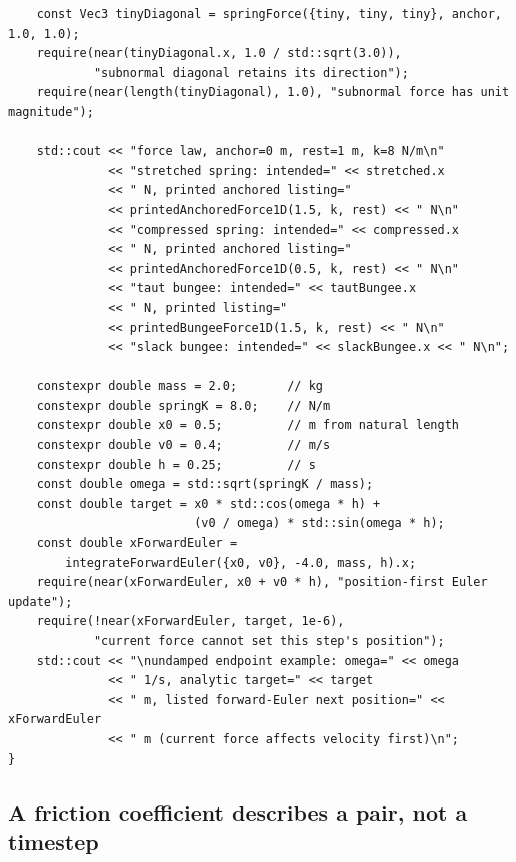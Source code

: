 \begin{verbatim}
    const Vec3 tinyDiagonal = springForce({tiny, tiny, tiny}, anchor, 1.0, 1.0);
    require(near(tinyDiagonal.x, 1.0 / std::sqrt(3.0)),
            "subnormal diagonal retains its direction");
    require(near(length(tinyDiagonal), 1.0), "subnormal force has unit magnitude");

    std::cout << "force law, anchor=0 m, rest=1 m, k=8 N/m\n"
              << "stretched spring: intended=" << stretched.x
              << " N, printed anchored listing="
              << printedAnchoredForce1D(1.5, k, rest) << " N\n"
              << "compressed spring: intended=" << compressed.x
              << " N, printed anchored listing="
              << printedAnchoredForce1D(0.5, k, rest) << " N\n"
              << "taut bungee: intended=" << tautBungee.x
              << " N, printed listing="
              << printedBungeeForce1D(1.5, k, rest) << " N\n"
              << "slack bungee: intended=" << slackBungee.x << " N\n";

    constexpr double mass = 2.0;       // kg
    constexpr double springK = 8.0;    // N/m
    constexpr double x0 = 0.5;         // m from natural length
    constexpr double v0 = 0.4;         // m/s
    constexpr double h = 0.25;         // s
    const double omega = std::sqrt(springK / mass);
    const double target = x0 * std::cos(omega * h) +
                          (v0 / omega) * std::sin(omega * h);
    const double xForwardEuler =
        integrateForwardEuler({x0, v0}, -4.0, mass, h).x;
    require(near(xForwardEuler, x0 + v0 * h), "position-first Euler update");
    require(!near(xForwardEuler, target, 1e-6),
            "current force cannot set this step's position");
    std::cout << "\nundamped endpoint example: omega=" << omega
              << " 1/s, analytic target=" << target
              << " m, listed forward-Euler next position=" << xForwardEuler
              << " m (current force affects velocity first)\n";
}
\end{verbatim}

\subsection{A friction coefficient describes a pair, not a timestep}\label{06-engine-ii-ch047-a-friction-coefficient-describes-a-pair-not-a-timestep}

\hypertarget{06-engine-ii-ch047-a-friction-coefficient-describes-a-pair-not-a-timestep}{}

